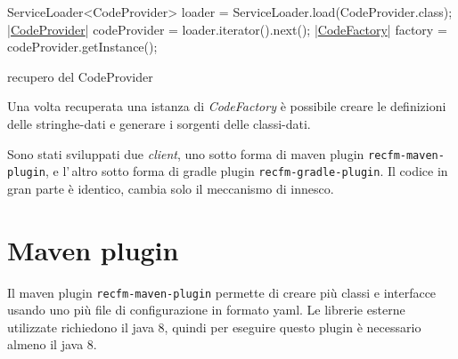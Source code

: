 \documentclass[a4paper,10pt]{report}
\newif\ifesource
\newenvironment{elisting}[1][H]
  {\captionsetup{aboveskip=0pt}\begin{listing}[#1]}
  {\end{listing}%
}
\begin{document}
\ifesource
\begin{figure*}[!htb]
\begin{lstlisting}[language=java, caption=recupero del CodeProvider, 
label=lst:getCodeProvider]
        ServiceLoader<CodeProvider> loader = ServiceLoader.load(CodeProvider.class);
        (*\hyperref[lst:CodeProvider]{CodeProvider}*) codeProvider = loader.iterator().next();
        (*\hyperref[lst:CodeFactory]{CodeFactory}*) factory = codeProvider.getInstance();
\end{lstlisting}
\end{figure*}
\else
\begin{elisting}[!htb]
\begin{javacode}
        ServiceLoader<CodeProvider> loader = ServiceLoader.load(CodeProvider.class);
        |\hyperref[lst:CodeProvider]{CodeProvider}| codeProvider = loader.iterator().next();
        |\hyperref[lst:CodeFactory]{CodeFactory}| factory = codeProvider.getInstance();
\end{javacode}
\caption{recupero del CodeProvider}
\label{lst:getCodeProvider}
\end{elisting}
\fi

Una volta recuperata una istanza di \textsl{CodeFactory} è possibile creare le
definizioni delle stringhe-dati e generare i sorgenti delle classi-dati.

Sono stati sviluppati due \textsl{client}, uno sotto forma di maven plugin 
\verb!recfm-maven-plugin!, e l'\,altro sotto forma di gradle plugin 
\verb!recfm-gradle-plugin!. Il codice in gran parte è identico, cambia solo il 
meccanismo di innesco.

\chapter{Maven plugin}\label{sec:maven}
Il maven plugin \verb!recfm-maven-plugin! permette di creare più classi e 
interfacce usando uno più file di configurazione in formato yaml.
Le librerie esterne utilizzate richiedono il java 8, quindi per eseguire questo 
plugin è necessario almeno il java 8.
\end{document}
